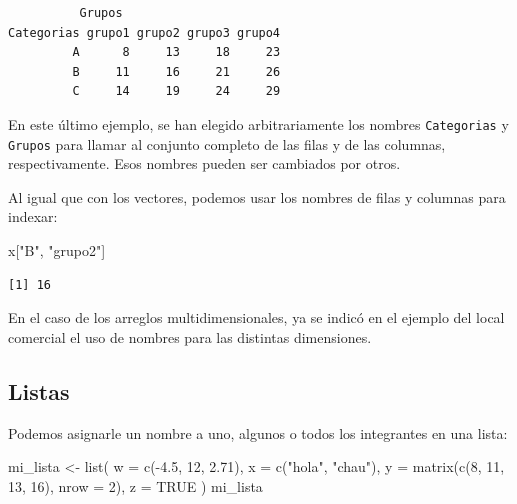 \documentclass[
]{book}
\newenvironment{Shaded}{\begin{snugshade}}{\end{snugshade}}
\newcommand{\AttributeTok}[1]{\textcolor[rgb]{0.77,0.63,0.00}{#1}}
\newcommand{\ConstantTok}[1]{\textcolor[rgb]{0.00,0.00,0.00}{#1}}
\newcommand{\DecValTok}[1]{\textcolor[rgb]{0.00,0.00,0.81}{#1}}
\newcommand{\FloatTok}[1]{\textcolor[rgb]{0.00,0.00,0.81}{#1}}
\newcommand{\FunctionTok}[1]{\textcolor[rgb]{0.00,0.00,0.00}{#1}}
\newcommand{\NormalTok}[1]{#1}
\newcommand{\OtherTok}[1]{\textcolor[rgb]{0.56,0.35,0.01}{#1}}
\newcommand{\SpecialCharTok}[1]{\textcolor[rgb]{0.00,0.00,0.00}{#1}}
\newcommand{\StringTok}[1]{\textcolor[rgb]{0.31,0.60,0.02}{#1}}
\begin{document}
\begin{verbatim}
          Grupos
Categorias grupo1 grupo2 grupo3 grupo4
         A      8     13     18     23
         B     11     16     21     26
         C     14     19     24     29
\end{verbatim}

En este último ejemplo, se han elegido arbitrariamente los nombres \texttt{Categorias} y \texttt{Grupos} para llamar al conjunto completo de las filas y de las columnas, respectivamente. Esos nombres pueden ser cambiados por otros.

Al igual que con los vectores, podemos usar los nombres de filas y columnas para indexar:

\begin{Shaded}
\begin{Highlighting}[]
\NormalTok{x[}\StringTok{"B"}\NormalTok{, }\StringTok{"grupo2"}\NormalTok{]}
\end{Highlighting}
\end{Shaded}

\begin{verbatim}
[1] 16
\end{verbatim}

En el caso de los arreglos multidimensionales, ya se indicó en el ejemplo del local comercial el uso de nombres para las distintas dimensiones.

\hypertarget{listas-1}{%
\subsection{Listas}\label{listas-1}}

Podemos asignarle un nombre a uno, algunos o todos los integrantes en una lista:

\begin{Shaded}
\begin{Highlighting}[]
\NormalTok{mi\_lista }\OtherTok{\textless{}{-}} \FunctionTok{list}\NormalTok{(}
    \AttributeTok{w =} \FunctionTok{c}\NormalTok{(}\SpecialCharTok{{-}}\FloatTok{4.5}\NormalTok{, }\DecValTok{12}\NormalTok{, }\FloatTok{2.71}\NormalTok{),}
    \AttributeTok{x =} \FunctionTok{c}\NormalTok{(}\StringTok{"hola"}\NormalTok{, }\StringTok{"chau"}\NormalTok{),}
    \AttributeTok{y =} \FunctionTok{matrix}\NormalTok{(}\FunctionTok{c}\NormalTok{(}\DecValTok{8}\NormalTok{, }\DecValTok{11}\NormalTok{, }\DecValTok{13}\NormalTok{, }\DecValTok{16}\NormalTok{), }\AttributeTok{nrow =} \DecValTok{2}\NormalTok{),}
    \AttributeTok{z =} \ConstantTok{TRUE}
\NormalTok{)}
\NormalTok{mi\_lista}
\end{Highlighting}
\end{Shaded}
\end{document}

